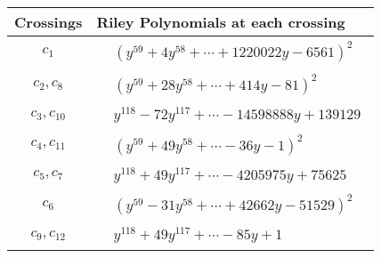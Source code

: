 \documentclass[1p]{elsarticle_modified}
\theoremstyle{definition}
\begin{document}
\begin{tabular}{m{50pt}|m{274pt}}
Crossings & \hspace{64pt}Riley Polynomials at each crossing \\
\hline $$\begin{aligned}c_{1}\end{aligned}$$&$\begin{aligned}
&(y^{59}+4 y^{58}+\cdots+1220022 y-6561)^{2}
\end{aligned}$\\
\hline $$\begin{aligned}c_{2},c_{8}\end{aligned}$$&$\begin{aligned}
&(y^{59}+28 y^{58}+\cdots+414 y-81)^{2}
\end{aligned}$\\
\hline $$\begin{aligned}c_{3},c_{10}\end{aligned}$$&$\begin{aligned}
&y^{118}-72 y^{117}+\cdots-14598888 y+139129
\end{aligned}$\\
\hline $$\begin{aligned}c_{4},c_{11}\end{aligned}$$&$\begin{aligned}
&(y^{59}+49 y^{58}+\cdots-36 y-1)^{2}
\end{aligned}$\\
\hline $$\begin{aligned}c_{5},c_{7}\end{aligned}$$&$\begin{aligned}
&y^{118}+49 y^{117}+\cdots-4205975 y+75625
\end{aligned}$\\
\hline $$\begin{aligned}c_{6}\end{aligned}$$&$\begin{aligned}
&(y^{59}-31 y^{58}+\cdots+42662 y-51529)^{2}
\end{aligned}$\\
\hline $$\begin{aligned}c_{9},c_{12}\end{aligned}$$&$\begin{aligned}
&y^{118}+49 y^{117}+\cdots-85 y+1
\end{aligned}$\\
\hline
\end{tabular}\\~\\
\end{document}
